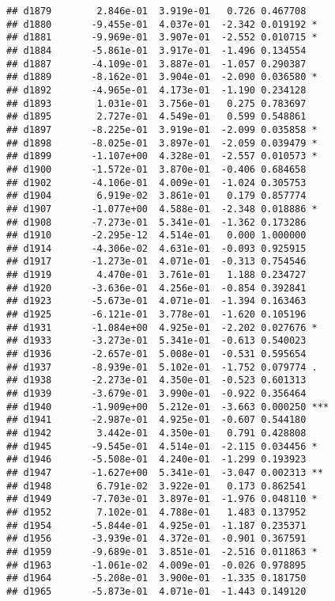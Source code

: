 \documentclass[
]{article}
\begin{document}
\begin{verbatim}
## d1879        2.846e-01  3.919e-01   0.726 0.467708    
## d1880       -9.455e-01  4.037e-01  -2.342 0.019192 *  
## d1881       -9.969e-01  3.907e-01  -2.552 0.010715 *  
## d1884       -5.861e-01  3.917e-01  -1.496 0.134554    
## d1887       -4.109e-01  3.887e-01  -1.057 0.290387    
## d1889       -8.162e-01  3.904e-01  -2.090 0.036580 *  
## d1892       -4.965e-01  4.173e-01  -1.190 0.234128    
## d1893        1.031e-01  3.756e-01   0.275 0.783697    
## d1895        2.727e-01  4.549e-01   0.599 0.548861    
## d1897       -8.225e-01  3.919e-01  -2.099 0.035858 *  
## d1898       -8.025e-01  3.897e-01  -2.059 0.039479 *  
## d1899       -1.107e+00  4.328e-01  -2.557 0.010573 *  
## d1900       -1.572e-01  3.870e-01  -0.406 0.684658    
## d1902       -4.106e-01  4.009e-01  -1.024 0.305753    
## d1904        6.919e-02  3.861e-01   0.179 0.857774    
## d1907       -1.077e+00  4.588e-01  -2.348 0.018886 *  
## d1908       -7.273e-01  5.341e-01  -1.362 0.173286    
## d1910       -2.295e-12  4.514e-01   0.000 1.000000    
## d1914       -4.306e-02  4.631e-01  -0.093 0.925915    
## d1917       -1.273e-01  4.071e-01  -0.313 0.754546    
## d1919        4.470e-01  3.761e-01   1.188 0.234727    
## d1920       -3.636e-01  4.256e-01  -0.854 0.392841    
## d1923       -5.673e-01  4.071e-01  -1.394 0.163463    
## d1925       -6.121e-01  3.778e-01  -1.620 0.105196    
## d1931       -1.084e+00  4.925e-01  -2.202 0.027676 *  
## d1933       -3.273e-01  5.341e-01  -0.613 0.540023    
## d1936       -2.657e-01  5.008e-01  -0.531 0.595654    
## d1937       -8.939e-01  5.102e-01  -1.752 0.079774 .  
## d1938       -2.273e-01  4.350e-01  -0.523 0.601313    
## d1939       -3.679e-01  3.990e-01  -0.922 0.356464    
## d1940       -1.909e+00  5.212e-01  -3.663 0.000250 ***
## d1941       -2.987e-01  4.925e-01  -0.607 0.544180    
## d1942        3.442e-01  4.350e-01   0.791 0.428808    
## d1945       -9.545e-01  4.514e-01  -2.115 0.034456 *  
## d1946       -5.508e-01  4.240e-01  -1.299 0.193923    
## d1947       -1.627e+00  5.341e-01  -3.047 0.002313 ** 
## d1948        6.791e-02  3.922e-01   0.173 0.862541    
## d1949       -7.703e-01  3.897e-01  -1.976 0.048110 *  
## d1952        7.102e-01  4.788e-01   1.483 0.137952    
## d1954       -5.844e-01  4.925e-01  -1.187 0.235371    
## d1956       -3.939e-01  4.372e-01  -0.901 0.367591    
## d1959       -9.689e-01  3.851e-01  -2.516 0.011863 *  
## d1963       -1.061e-02  4.009e-01  -0.026 0.978895    
## d1964       -5.208e-01  3.900e-01  -1.335 0.181750    
## d1965       -5.873e-01  4.071e-01  -1.443 0.149120    

\end{verbatim}
\end{document}
